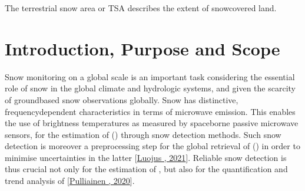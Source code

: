 \documentclass[letterpaper,10pt,english]{jupyterBook}
\begin{document}
\begin{description}
\sphinxAtStartPar
The terrestrial snow area or TSA describes the extent of snow\sphinxhyphen{}covered land.

\end{description}

\sphinxstepscope


\chapter{Introduction, Purpose and Scope}
\label{\detokenize{book/introduction_purpose_scope:introduction-purpose-and-scope}}\label{\detokenize{book/introduction_purpose_scope::doc}}
\sphinxAtStartPar
Snow monitoring on a global scale is an important task considering the essential role of snow in the global climate and hydrologic systems, and given the scarcity of ground\sphinxhyphen{}based snow observations globally.
Snow has distinctive, frequency\sphinxhyphen{}dependent characteristics in terms of microwave emission.
This enables the use of brightness temperatures as measured by spaceborne passive microwave sensors, for the estimation of {\hyperref[\detokenize{book/definitions:term-Terrestrial-snow-area}]{}} ({\hyperref[\detokenize{book/acronyms:term-TSA}]{}}) through snow detection methods.
Such snow detection is moreover a preprocessing step for the global retrieval of {\hyperref[\detokenize{book/definitions:term-Snow-water-equivalent}]{}} ({\hyperref[\detokenize{book/acronyms:term-SWE}]{}}) in order to minimise uncertainties in the latter {[}\hyperlink{cite.book/references:id22}{Luojus , 2021}{]}.
Reliable snow detection is thus crucial not only for the estimation of {\hyperref[\detokenize{book/acronyms:term-TSA}]{}}, but also for the quantification and trend analysis of {\hyperref[\detokenize{book/acronyms:term-SWE}]{}} {[}\hyperlink{cite.book/references:id6}{Pulliainen , 2020}{]}.
\end{document}
